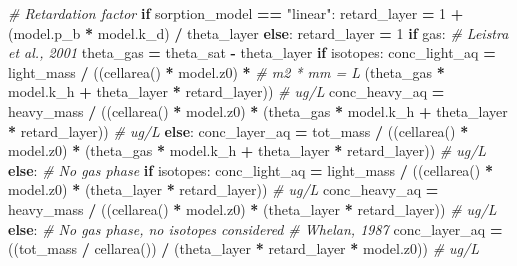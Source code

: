 \documentclass[]{article}
\newenvironment{Shaded}{\begin{snugshade}}{\end{snugshade}}
\newcommand{\DecValTok}[1]{\textcolor[rgb]{0.00,0.00,0.81}{{#1}}}
\newcommand{\StringTok}[1]{\textcolor[rgb]{0.31,0.60,0.02}{{#1}}}
\newcommand{\CommentTok}[1]{\textcolor[rgb]{0.56,0.35,0.01}{\textit{{#1}}}}
\newcommand{\ControlFlowTok}[1]{\textcolor[rgb]{0.13,0.29,0.53}{\textbf{{#1}}}}
\newcommand{\OperatorTok}[1]{\textcolor[rgb]{0.81,0.36,0.00}{\textbf{{#1}}}}
\newcommand{\NormalTok}[1]{{#1}}
\begin{document}
\begin{Shaded}
\begin{Highlighting}[]
        \CommentTok{# Retardation factor}
        \ControlFlowTok{if} \NormalTok{sorption_model }\OperatorTok{==} \StringTok{"linear"}\NormalTok{:}
            \NormalTok{retard_layer }\OperatorTok{=} \DecValTok{1} \OperatorTok{+} \NormalTok{(model.p_b }\OperatorTok{*} \NormalTok{model.k_d) }\OperatorTok{/} \NormalTok{theta_layer}
        \ControlFlowTok{else}\NormalTok{:}
            \NormalTok{retard_layer }\OperatorTok{=} \DecValTok{1}
        \ControlFlowTok{if} \NormalTok{gas:}
            \CommentTok{# Leistra et al., 2001}
            \NormalTok{theta_gas }\OperatorTok{=} \NormalTok{theta_sat }\OperatorTok{-} \NormalTok{theta_layer}
            \ControlFlowTok{if} \NormalTok{isotopes:}
                \NormalTok{conc_light_aq }\OperatorTok{=} \NormalTok{light_mass }\OperatorTok{/} \NormalTok{((cellarea() }\OperatorTok{*} \NormalTok{model.z0) }\OperatorTok{*}  \CommentTok{# m2 * mm = L}
                                              \NormalTok{(theta_gas }\OperatorTok{*} \NormalTok{model.k_h }\OperatorTok{+}
                                               \NormalTok{theta_layer }\OperatorTok{*} \NormalTok{retard_layer))  }\CommentTok{# ug/L}
                \NormalTok{conc_heavy_aq }\OperatorTok{=} \NormalTok{heavy_mass }\OperatorTok{/} \NormalTok{((cellarea() }\OperatorTok{*} \NormalTok{model.z0) }\OperatorTok{*}
                                              \NormalTok{(theta_gas }\OperatorTok{*} \NormalTok{model.k_h }\OperatorTok{+}
                                               \NormalTok{theta_layer }\OperatorTok{*} \NormalTok{retard_layer))  }\CommentTok{# ug/L}
            \ControlFlowTok{else}\NormalTok{:}
                \NormalTok{conc_layer_aq }\OperatorTok{=} \NormalTok{tot_mass }\OperatorTok{/} \NormalTok{((cellarea() }\OperatorTok{*} \NormalTok{model.z0) }\OperatorTok{*}
                                            \NormalTok{(theta_gas }\OperatorTok{*} \NormalTok{model.k_h }\OperatorTok{+}
                                             \NormalTok{theta_layer }\OperatorTok{*} \NormalTok{retard_layer))  }\CommentTok{# ug/L}
        \ControlFlowTok{else}\NormalTok{:  }\CommentTok{# No gas phase}
            \ControlFlowTok{if} \NormalTok{isotopes:}
                \NormalTok{conc_light_aq }\OperatorTok{=} \NormalTok{light_mass }\OperatorTok{/} \NormalTok{((cellarea() }\OperatorTok{*} \NormalTok{model.z0) }\OperatorTok{*}
                                              \NormalTok{(theta_layer }\OperatorTok{*} \NormalTok{retard_layer))  }\CommentTok{# ug/L}
                \NormalTok{conc_heavy_aq }\OperatorTok{=} \NormalTok{heavy_mass }\OperatorTok{/} \NormalTok{((cellarea() }\OperatorTok{*} \NormalTok{model.z0) }\OperatorTok{*}
                                              \NormalTok{(theta_layer }\OperatorTok{*} \NormalTok{retard_layer))  }\CommentTok{# ug/L}
            \ControlFlowTok{else}\NormalTok{:  }\CommentTok{# No gas phase, no isotopes considered}
                \CommentTok{# Whelan, 1987}
                \NormalTok{conc_layer_aq }\OperatorTok{=} \NormalTok{((tot_mass }\OperatorTok{/} \NormalTok{cellarea()) }\OperatorTok{/}
                                 \NormalTok{(theta_layer }\OperatorTok{*} \NormalTok{retard_layer }\OperatorTok{*} \NormalTok{model.z0))  }\CommentTok{# ug/L}


\end{Highlighting}
\end{Shaded}
\end{document}
